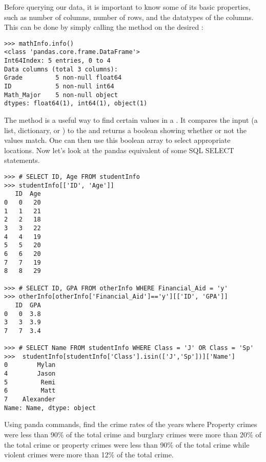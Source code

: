 Before querying our data, it is important to know some of its basic properties,
such as number of columns, number of rows, and the datatypes of the columns.
This can be done by simply calling the  method on the desired
:

\begin{lstlisting}
>>> mathInfo.info()
<class 'pandas.core.frame.DataFrame'>
Int64Index: 5 entries, 0 to 4
Data columns (total 3 columns):
Grade         5 non-null float64
ID            5 non-null int64
Math_Major    5 non-null object
dtypes: float64(1), int64(1), object(1)
\end{lstlisting}

\begin{comment}
We can also get some basic information about the structure of the \li{DataFrame}
using the \li{head()} or \li{tail()} methods.

\begin{lstlisting}
>>> mathInfo.head()
   Grade  ID Math_Major  ID  Age  GPA
0    4.0   0          y   0   20  3.8
1    3.0   1          n   2   18  3.0
2    3.5   5          y   4   19  2.8
3    3.0   6          n   6   20  3.8
4    4.0   3          n   7   19  3.4
\end{lstlisting}
\end{comment}

The method  is a useful way to find certain values in a
. 
It compares the input (a list, dictionary, or )
to the  and returns a boolean  showing whether or
not the values match.
One can then use this boolean array to select appropriate
locations.
Now let's look at the pandas equivalent of some SQL SELECT statements.
\begin{lstlisting}
>>> # SELECT ID, Age FROM studentInfo
>>> studentInfo[['ID', 'Age']]
   ID  Age
0   0   20
1   1   21
2   2   18
3   3   22
4   4   19
5   5   20
6   6   20
7   7   19
8   8   29

>>> # SELECT ID, GPA FROM otherInfo WHERE Financial_Aid = 'y'
>>> otherInfo[otherInfo['Financial_Aid']=='y'][['ID', 'GPA']]
   ID  GPA
0   0  3.8
3   3  3.9
7   7  3.4

>>> # SELECT Name FROM studentInfo WHERE Class = 'J' OR Class = 'Sp'
>>>  studentInfo[studentInfo['Class'].isin(['J','Sp'])]['Name']
0        Mylan
4        Jason
5         Remi
6         Matt
7    Alexander
Name: Name, dtype: object
\end{lstlisting}

\begin{problem}
Using panda commands, find the crime rates of the years where Property crimes were less than 90$\%$ of the total crime and burglary crimes were more than 20$\%$ of the total crime or property crimes were less than 90$\%$ of the total crime while violent crimes were more than 12$\%$ of the total crime.
\end{problem}

